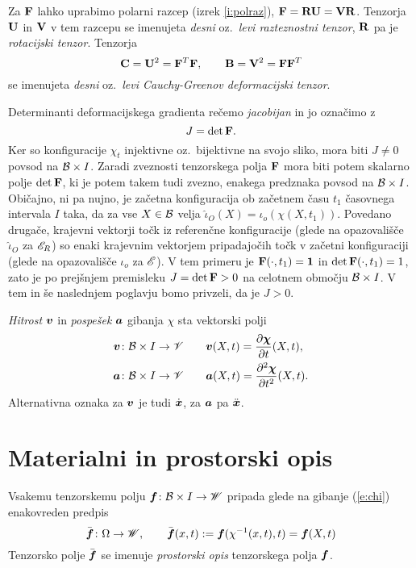 Za $\mathbf F$ lahko uprabimo polarni razcep (izrek \ref{i:polraz}), $\mathbf F=\mathbf R\mathbf U=\mathbf V\mathbf R$.
Tenzorja $\mathbf U$ in $\mathbf V$ v tem razcepu se imenujeta \emph{desni} oz.~\emph{levi razteznostni
tenzor}, $\mathbf R$ pa je \emph{rotacijski tenzor}. Tenzorja
\[
	\mathbf C=\mathbf U^2=\mathbf F^T\mathbf F,\qquad\mathbf B=\mathbf V^2=\mathbf F\mathbf F^T
\]
se imenujeta \emph{desni} oz.~\emph{levi Cauchy-Greenov deformacijski tenzor}.

Determinanti deformacijskega gradienta rečemo \emph{jacobijan} in jo označimo z
\[
	J=\det\mathbf F.
\]
Ker so konfiguracije $\chi_t$
injektivne oz.~bijektivne na svojo sliko, mora biti $J\neq 0$ povsod na $\mathcal B\times I$.
Zaradi zveznosti tenzorskega polja $\mathbf F$ mora biti potem skalarno polje $\det\mathbf F$,
ki je potem takem tudi zvezno, enakega predznaka povsod na $\mathcal B\times I$.
Običajno, ni pa nujno, je začetna konfiguracija ob začetnem času $t_1$ časovnega intervala $I$
taka, da za vse $X\in\mathcal B$ velja $\hat{\iota}_{O}(X)=\iota_o(\chi(X,t_1))$. Povedano drugače,
krajevni vektorji točk iz referenčne konfiguracije (glede na opazovališče $\hat{\iota}_{O}$ za $\mathscr E_R$)
so enaki krajevnim vektorjem pripadajočih točk v začetni konfiguraciji (glede na opazovališče $\iota_o$ za $\mathscr E$).
V tem primeru je $\mathbf F(\cdot,t_1)=\mathbf 1$ in $\det\mathbf F(\cdot,t_1)=1$, zato je po prejšnjem
premisleku $J=\det\mathbf F>0$ na celotnem območju $\mathcal B\times I$. V tem in še naslednjem poglavju bomo privzeli, da je $J>0$.

\emph{Hitrost} $\boldsymbol v$ in \emph{pospešek} $\boldsymbol a$ gibanja $\chi$ sta vektorski polji
\begin{align}
	\boldsymbol v\colon \mathcal B\times I\to \mathscr V \qquad & \boldsymbol v(X,t) = \frac{\partial\boldsymbol \chi}{\partial t}(X,t), \label{e:v} \\
	\boldsymbol a\colon \mathcal B\times I\to \mathscr V \qquad & \boldsymbol a(X,t) = \frac{\partial^2\boldsymbol \chi}{\partial t^2}(X,t). \label{e:a}
\end{align}
Alternativna oznaka za $\boldsymbol v$ je tudi $\dot{\boldsymbol x}$, za $\boldsymbol a$ pa $\ddot{\boldsymbol x}$.


\section{Materialni in prostorski opis}


Vsakemu tenzorskemu polju $\boldsymbol f\colon \mathcal B\times I\to\mathscr W$ pripada glede na gibanje
(\ref{e:chi}) enakovreden predpis
\[
	\bar{\boldsymbol f}\colon\Omega\to\mathscr W,\qquad
	\bar{\boldsymbol f}(x,t):=\boldsymbol f(\chi^{-1}(x,t),t)=\boldsymbol f(X,t)
\]
Tenzorsko polje $\bar{\boldsymbol f}$ se imenuje \emph{prostorski opis} tenzorskega polja $\boldsymbol f$.


